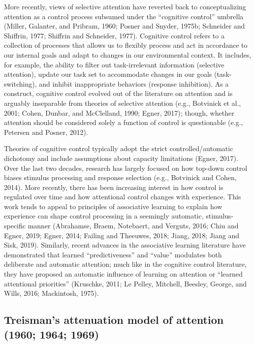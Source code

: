 \documentclass[]{DissertateCUNY}
\begin{document}
More recently, views of selective attention have reverted back to
conceptualizing attention as a control process subsumed under the
``cognitive control'' umbrella (Miller, Galanter, and Pribram, 1960;
Posner and Snyder, 1975b; Schneider and Shiffrin, 1977; Shiffrin and
Schneider, 1977). Cognitive control refers to a collection of processes
that allows us to flexibly process and act in accordance to our internal
goals and adapt to changes in our environmental context. It includes,
for example, the ability to filter out task-irrelevant information
(selective attention), update our task set to accommodate changes in our
goals (task-switching), and inhibit inappropriate behaviors (response
inhibition). As a construct, cognitive control evolved out of the
literature on attention and is arguably inseparable from theories of
selective attention (e.g., Botvinick et al., 2001; Cohen, Dunbar, and
McClelland, 1990; Egner, 2017); though, whether attention should be
considered solely a function of control is questionable (e.g., Petersen
and Posner, 2012).

Theories of cognitive control typically adopt the strict
controlled/automatic dichotomy and include assumptions about capacity
limitations (Egner, 2017). Over the last two decades, research has
largely focused on how top-down control biases stimulus processing and
response selection (e.g., Botvinick and Cohen, 2014). More recently,
there has been increasing interest in how control is regulated over time
and how attentional control changes with experience. This work tends to
appeal to principles of associative learning to explain how experience
can shape control processing in a seemingly automatic, stimulus-specific
manner (Abrahamse, Braem, Notebaert, and Verguts, 2016; Chiu and Egner,
2019; Egner, 2014; Failing and Theeuwes, 2018; Jiang, 2018; Jiang and
Sisk, 2019). Similarly, recent advances in the associative learning
literature have demonstrated that learned ``predictiveness'' and
``value'' modulates both deliberate and automatic attention; much like
in the cognitive control literature, they have proposed an automatic
influence of learning on attention or ``learned attentional priorities''
(Kruschke, 2011; Le Pelley, Mitchell, Beesley, George, and Wills, 2016;
Mackintosh, 1975).

\hypertarget{treismans-attenuation-model-of-attention-1960-1964-1969}{%
\subsection{Treisman's attenuation model of attention (1960; 1964;
1969)}\label{treismans-attenuation-model-of-attention-1960-1964-1969}}
\end{document}
